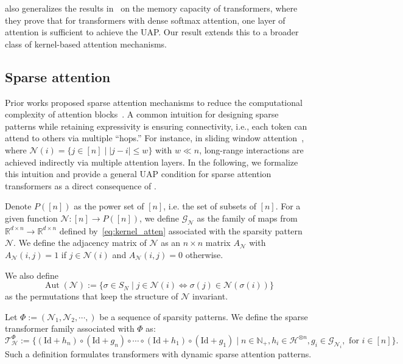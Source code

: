 \documentclass{article}
\newcommand{\ql}[1]{{\footnotesize\textcolor{red}{QL: #1}}}
\begin{document}
also generalizes the results in~\cite{kajitsukatransformers} on the memory capacity of transformers, where they prove that for  transformers with dense softmax attention, one layer of attention is sufficient to achieve the UAP. Our result extends this to a broader class of kernel-based attention mechanisms.

\subsection{Sparse attention}
\label{sec:sparse_atten}

Prior works proposed sparse attention mechanisms to reduce the computational complexity of attention blocks~\cite{child2019generating,beltagy2020longformer,zaheer2020big,kitaev2020reformer, guo2019star,correia2019adaptively}. A common intuition for designing sparse patterns while retaining expressivity is ensuring connectivity, i.e., each token can attend to others via multiple “hops.” For instance, in sliding window attention~\cite{beltagy2020longformer}, where $\mathcal N(i)=\{j\in[n]\mid |j-i|\le w\}$ with $w\ll n$, long-range interactions are achieved indirectly via multiple attention layers. In the following, we formalize this intuition and provide a general UAP condition for sparse attention transformers as a direct consequence of .

Denote $P([n])$ as the power set of $[n]$, i.e. the set of subsets of $[n]$.
For a given function $\mathcal N:[n]\to P([n])$, we define
$\mathcal G_{\mathcal N}$ as the family of maps  from $\mathbb R^{d\times n}\to\mathbb R^{d\times n}$ defined by~\eqref{eq:kernel_atten} associated with the sparsity pattern $\mathcal N$. 
We define the adjacency matrix of $\mathcal N$ as an $n\times n$ matrix $A_{\mathcal N}$ with $A_{\mathcal N}(i,j)=1$ if $j\in \mathcal N(i)$ and $A_{\mathcal N}(i,j)=0$ otherwise.


We also define
\begin{equation}
    \operatorname{Aut}(\mathcal N):=\{\sigma\in S_N\mid j\in \mathcal N(i)\Leftrightarrow \sigma(j)\in \mathcal N(\sigma(i))\}
\end{equation}
as the permutations that keep the structure of $\mathcal N$ invariant.

Let $\Phi:=(\mathcal N_1,\mathcal N_2,\cdots, )$ be a sequence of sparsity patterns. We define the sparse transformer family associated with $\Phi$ as:
\begin{equation}
    \mathcal T_{\mathcal H}^\Phi:=\{(\mathrm{Id}+h_n)\circ(\mathrm{Id}+g_n)\circ \cdots \circ(\mathrm{Id}+h_1)\circ(\mathrm{Id}+g_1)\mid n\in \mathbb N_+, h_i\in \mathcal H^{\otimes n}, g_i\in\mathcal G_{\mathcal N_i}, \text{ for } i\in [n]\}.
\end{equation}
Such a definition formulates transformers with dynamic sparse attention patterns. 
\end{document}

